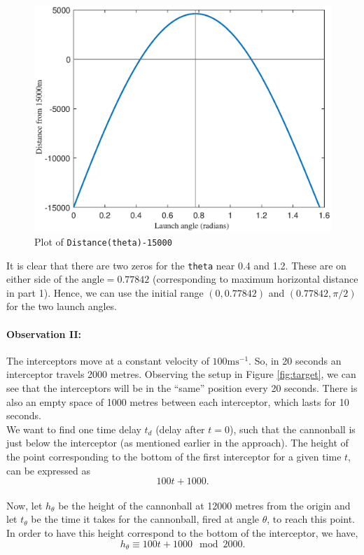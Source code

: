 \documentclass[11pt]{report}
\begin{document}
 \begin{figure}[h]
	\centering
  	\includegraphics[scale=0.5]{assets/fzero_theta.eps}
  	\caption{Plot of \texttt{Distance(theta)-15000}}
  	\label{fig:fzero}
\end{figure}

It is clear that there are two zeros for the \texttt{theta} near 0.4 and 1.2. These are on either side of the $\text{angle}=0.77842$ (corresponding to maximum horizontal distance in part 1). Hence, we can use the initial range $(0, 0.77842)$ and $(0.77842, \pi/2)$ for the two launch angles.

\paragraph{Observation II:} The interceptors move at a constant velocity of $100\text{ms}^{-1}$. So, in 20 seconds an interceptor travels 2000 metres. Observing the setup in Figure \ref{fig:target}, we can see that the interceptors will be in the ``same'' position every 20 seconds. There is also an empty space of 1000 metres between each interceptor, which lasts for 10 seconds. \\

We want to find one time delay $t_d$ (delay after $t=0$), such that the cannonball is just below the interceptor (as mentioned earlier in the approach). The height of the point corresponding to the bottom of the first interceptor for a given time $t$, can be expressed as $$ 100t + 1000. $$\\

Now, let $h_{\theta}$ be the height of the cannonball at 12000 metres from the origin and let $t_{\theta}$ be the time it takes for the cannonball, fired at angle $\theta$, to reach this point. In order to have this height correspond to the bottom of the interceptor, we have, $$h_{\theta} \equiv 100t + 1000 \mod 2000.$$ \\
\end{document}
